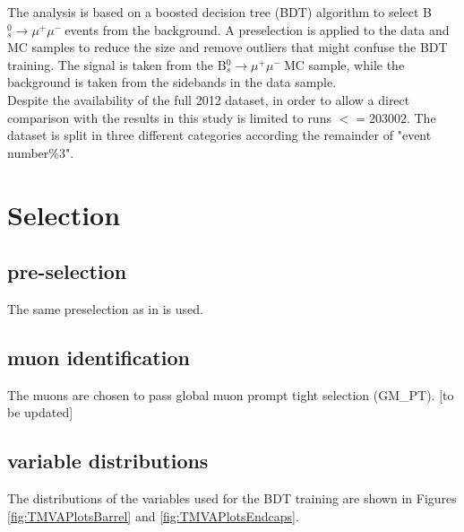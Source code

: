 \documentclass[10pt,a4paper]{article}
\newcommand{\BsMuMu}{B$^{0}_{s}\rightarrow \mu^+\mu^-\ $}
\begin{document}
The analysis is based on a boosted decision tree (BDT) algorithm to select \BsMuMu events from the
background.
A preselection is applied to the data and MC samples to reduce the size and remove outliers that
might confuse the BDT training.
The signal is taken from the \BsMuMu MC sample, while the background is taken from the sidebands
in the data sample.
\\
Despite the availability of the full 2012 dataset, in order to allow a direct comparison with
the results in \cite{MainAN} this study is limited to runs $<= 203002$.
The dataset is split in three different categories according the remainder of "event number$\%3$".


\section{Selection}

\subsection{pre-selection}

The same preselection as in \cite{MainAN} is used. 


\subsection{muon identification}

The muons are chosen to pass global muon prompt tight
selection (GM\_PT). [to be updated]

\subsection{variable distributions}




The distributions of the variables used for the BDT training are shown in Figures \ref{fig:TMVAPlotsBarrel} and \ref{fig:TMVAPlotsEndcaps}.
\end{document}
